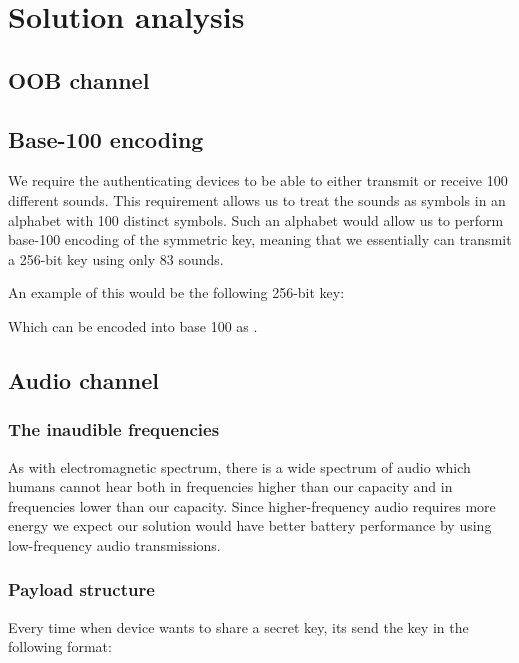 \documentclass[12pt]{article}
\begin{document}
\newpage
\section{Solution analysis}

\subsection{OOB channel}

\subsection{Base-100 encoding}

We require the authenticating devices to be able to either transmit or receive 100 different sounds. This requirement allows us to treat the sounds as symbols in an alphabet with 100 distinct symbols. Such an alphabet would allow us to perform base-100 encoding of the symmetric key, meaning that we essentially can transmit a 256-bit key using only 83 sounds.

An example of this would be the following 256-bit key:


Which can be encoded into base 100 as .

\subsection{Audio channel}

\subsubsection{The inaudible frequencies}
\label{subs:The inaudible frequencies}

As with electromagnetic spectrum, there is a wide spectrum of audio which humans cannot hear both in frequencies higher than our capacity and in frequencies lower than our capacity. Since higher-frequency audio requires more energy we expect our solution would have better battery performance by using low-frequency audio transmissions.

\subsubsection{Payload structure}
Every time when device wants to share a secret key, its send the key in the following format:
\end{document}
